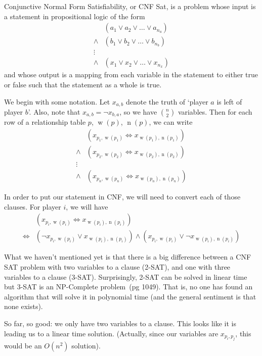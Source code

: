 \documentclass[12pt,x11names, rgb]{article}
\DeclareMathOperator{\w}{w}
\DeclareMathOperator{\n}{n}
\begin{document}
    Conjunctive Normal Form Satisfiability, or CNF Sat, is a problem whose input is a statement in propositional logic of the form
        \begin{align*} 
                    & (a_1 \vee a_2 \vee \ldots \vee a_{n_a}) \\
            \wedge  & (b_1 \vee b_2 \vee \ldots \vee b_{n_b})\\
            \vdots  &\\
            \wedge  & (x_1 \vee x_2 \vee \ldots \vee x_{n_x})
        \end{align*}
    and whose output is a mapping from each variable in the statement to either true or false such that the statement as a whole is true. 

    We begin with some notation. Let $x_{a,b}$ denote the truth of `player $a$ is left of player $b$'. Also, note that $x_{a,b} = \lnot x_{b,a}$, so we have $\binom{n}{2}$ variables. Then for each row of a relationship table $p$, $\w(p)$, $\n(p)$, we can write
        \begin{align*}
                    & (x_{p_1, \w(p_1)} \Leftrightarrow x_{\w(p_1), \n(p_1)})\\
            \wedge  & (x_{p_2, \w(p_2)} \Leftrightarrow x_{\w(p_2), \n(p_2)})\\
            \vdots  &\\
            \wedge  & (x_{p_n, \w(p_n)} \Leftrightarrow x_{\w(p_n), \n(p_n)})
        \end{align*}

    In order to put our statement in CNF, we will need to convert each of those clauses. For player $i$, we will have 
        \begin{align*}
            & (x_{p_i, \w(p_i)} \Leftrightarrow x_{\w(p_i), \n(p_i)})\\
            \Leftrightarrow & (\lnot x_{p_i, \w(p_i)} \vee x_{\w(p_i), \n(p_i)}) \wedge (x_{p_i, \w(p_i)} \vee \lnot x_{\w(p_i), \n(p_i)})
        \end{align*}

    What we haven't mentioned yet is that there is a big difference between a CNF SAT problem with two variables to a clause (2-SAT), and one with three variables to a clause (3-SAT). Surprisingly, 2-SAT can be solved in linear time but 3-SAT is an NP-Complete problem~\cite{clrs}(pg 1049). That is, no one has found an algorithm that will solve it in polynomial time (and the general sentiment is that none exists).

    So far, so good: we only have two variables to a clause. This looks like it is leading us to a linear time solution. (Actually, since our variables are $x_{p_i, p_j}$, this would be an $O(n^2)$ solution). 
\end{document}
